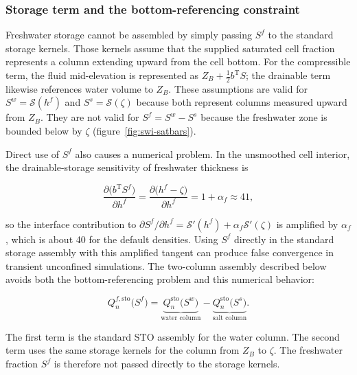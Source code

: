 \subsubsection{Storage term and the bottom-referencing constraint}
\label{sec:swi-storage}

Freshwater storage cannot be assembled by simply passing $S^{f}$ to the standard \mf storage kernels. Those kernels assume that the supplied saturated cell fraction represents a column extending upward from the cell bottom. For the compressible term, the fluid mid-elevation is represented as $Z_{B}+\tfrac12 b^{\mathrm{T}}S$; the drainable term likewise references water volume to $Z_{B}$. These assumptions are valid for $S^{w}=\mathcal{S}(h^{f})$ and $S^{s}=\mathcal{S}(\zeta)$ because both represent columns measured upward from $Z_{B}$. They are not valid for $S^{f}=S^{w}-S^{s}$ because the freshwater zone is bounded below by $\zeta$ (figure~\ref{fig:swi-satbars}).

Direct use of $S^{f}$ also causes a numerical problem. In the unsmoothed cell interior, the drainable-storage sensitivity of freshwater thickness is

\begin{equation}
\label{eqn:swi-zonederiv}
\frac{\partial\big(b^{\mathrm{T}}S^{f}\big)}{\partial h^{f}}
=\frac{\partial\big(h^{f}-\zeta\big)}{\partial h^{f}}
=1+\alpha_{f}\approx 41,
\end{equation}

\noindent so the interface contribution to $\partial S^{f}/\partial h^{f}=\mathcal{S}'(h^{f})+\alpha_{f}\mathcal{S}'(\zeta)$ is amplified by $\alpha_{f}$, which is about 40 for the default densities. Using $S^{f}$ directly in the standard storage assembly with this amplified tangent can produce false convergence in transient unconfined simulations. The two-column assembly described below avoids both the bottom-referencing problem and this numerical behavior:

\begin{equation}
\label{eqn:swi-twocol}
Q_{n}^{f,\mathrm{sto}}\big(S^{f}\big)
=\underbrace{Q_{n}^{\mathrm{sto}}\big(S^{w}\big)}_{\text{water column}}
-\underbrace{Q_{n}^{\mathrm{sto}}\big(S^{s}\big)}_{\text{salt column}}.
\end{equation}

\noindent The first term is the standard STO assembly for the water column. The second term uses the same storage kernels for the column from $Z_{B}$ to $\zeta$. The freshwater fraction $S^{f}$ is therefore not passed directly to the storage kernels.

